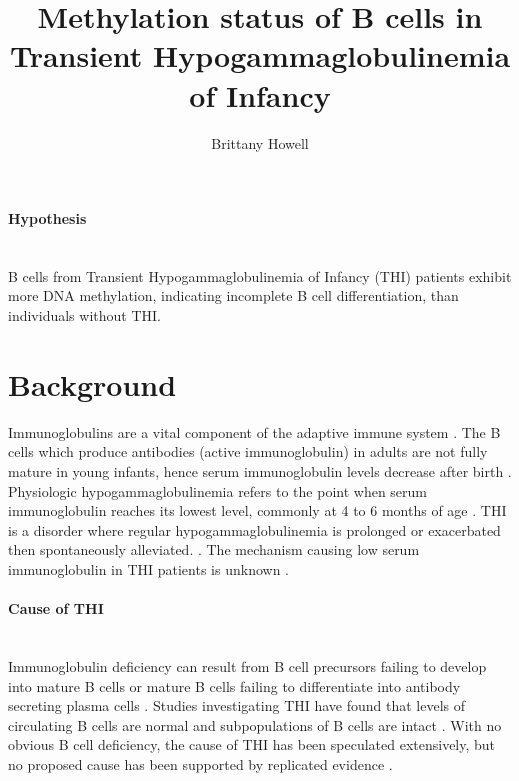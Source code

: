 \documentclass[12pt]{article}
\title{Methylation status of B cells in Transient Hypogammaglobulinemia of Infancy}
\date{}
\author{Brittany Howell}
\begin{document}
	\maketitle
	
	\paragraph{Hypothesis}
	~\\
	B cells from Transient Hypogammaglobulinemia of Infancy (THI) patients exhibit more DNA methylation, indicating incomplete B cell differentiation, than individuals without THI.
	
	\section{Background}
	
		Immunoglobulins are a vital component of the adaptive immune system \citep{Simon15}.  
		The B cells which produce antibodies (active immunoglobulin) in adults are not fully mature in young infants, hence serum immunoglobulin levels decrease after birth \citep{Martin10,Rechavi15,Stiemh80}. 
		Physiologic hypogammaglobulinemia refers to the point when serum immunoglobulin reaches its lowest level, commonly at 4 to 6 months of age \citep{Dressler89}. 
		THI is a disorder where regular hypogammaglobulinemia is prolonged or exacerbated then spontaneously alleviated. \citep{Stiemh80,Dressler89,AlHerz14,Gitlin56,AlHerz11,Rosen66,McGeady87, Dalal98,Tiller78,Buckley83}.
		The mechanism causing low serum immunoglobulin in THI patients is unknown \citep{AlHerz14}. 

		\paragraph{Cause of THI} 
			~\\
			Immunoglobulin deficiency can result from B cell precursors failing to develop into mature B cells or mature B cells failing to differentiate into antibody secreting plasma cells \citep{Fiorilli86}. 
			Studies investigating THI have found that levels of circulating B cells are normal and subpopulations of B cells are intact \citep{Tiller78,Stiemh80,Siegel81,Buckley83,Fiorilli86,Dressler89}.
			With no obvious B cell deficiency, the cause of THI has been speculated extensively, but no proposed cause has been supported by replicated evidence \citep{Fudenberg64,Rosen66,Nathenson71,Willenbockel60,Soothill68,Tiller78,Fiorilli86,Ovadia14,Siegel81,McGeady87}.
			
\end{document}
